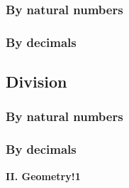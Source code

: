 \documentclass[a4paper, 12pt]{article}
\begin{document}
	\subsubsection{By natural numbers}
	\subsubsection{By decimals}
	\subsection{Division}
	\subsubsection{By natural numbers}
	\subsubsection{By decimals} \hspace{1.5cm}

	{\huge \textbf{II. Geometry!1}}

	
		
\end{document}
